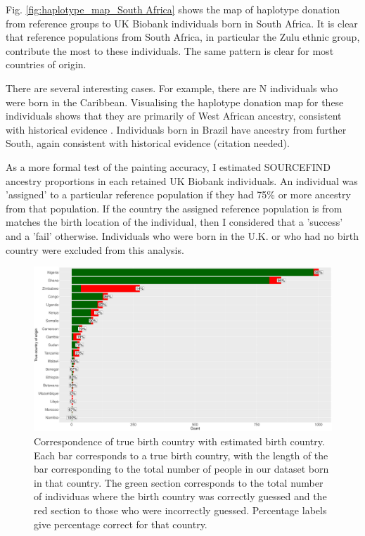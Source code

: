Fig. \ref{fig:haplotype_map_South Africa} shows the map of haplotype donation from reference groups to UK Biobank individuals born in South Africa. It is clear that reference populations from South Africa, in particular the Zulu ethnic group, contribute the most to these individuals. The same pattern is clear for most countries of origin. 

There are several interesting cases. For example, there are N individuals who were born in the Caribbean. Visualising the haplotype donation map for these individuals shows that they are primarily of West African ancestry, consistent with historical evidence \cite{micheletti2020genetic}. Individuals born in Brazil have ancestry from further South, again consistent with historical evidence (citation needed).

As a more formal test of the painting accuracy, I estimated SOURCEFIND ancestry proportions in each retained UK Biobank individuals. An individual was 'assigned' to a particular reference population if they had 75\% or more ancestry from that population. If the country the assigned reference population is from matches the birth location of the individual, then I considered that a 'success' and a 'fail' otherwise. Individuals who were born in the U.K. or who had no birth country were excluded from this analysis. 

\begin{figure}[htp]
    \centering
    \includegraphics[width=1.0\textwidth]{../images/chapter3/country_of_origin_allInds.png}
    \caption{Correspondence of true birth country with estimated birth country. Each bar corresponds to a true birth country, with the length of the bar corresponding to the total number of people in our dataset born in that country. The green section corresponds to the total number of individuas where the birth country was correctly guessed and the red section to those who were incorrectly guessed. Percentage labels give percentage correct for that country.}
    \label{fig:country_of_origin_allInds}
\end{figure}

